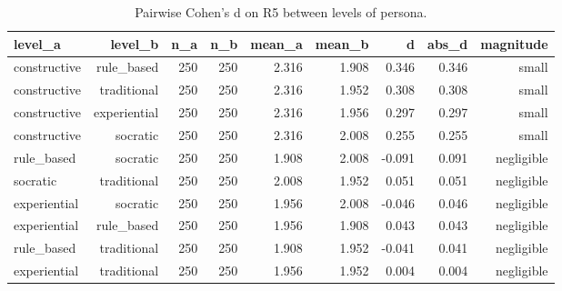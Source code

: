\begin{table}[htbp]
\centering
\caption{Pairwise Cohen's d on R5 between levels of persona.}
\label{tab:cohensd-persona-R5}
\begin{tabular}{lrrrrrrrr}
\toprule
level\_a & level\_b & n\_a & n\_b & mean\_a & mean\_b & d & abs\_d & magnitude \\
\midrule
constructive & rule\_based & 250 & 250 & 2.316 & 1.908 & 0.346 & 0.346 & small \\
constructive & traditional & 250 & 250 & 2.316 & 1.952 & 0.308 & 0.308 & small \\
constructive & experiential & 250 & 250 & 2.316 & 1.956 & 0.297 & 0.297 & small \\
constructive & socratic & 250 & 250 & 2.316 & 2.008 & 0.255 & 0.255 & small \\
rule\_based & socratic & 250 & 250 & 1.908 & 2.008 & -0.091 & 0.091 & negligible \\
socratic & traditional & 250 & 250 & 2.008 & 1.952 & 0.051 & 0.051 & negligible \\
experiential & socratic & 250 & 250 & 1.956 & 2.008 & -0.046 & 0.046 & negligible \\
experiential & rule\_based & 250 & 250 & 1.956 & 1.908 & 0.043 & 0.043 & negligible \\
rule\_based & traditional & 250 & 250 & 1.908 & 1.952 & -0.041 & 0.041 & negligible \\
experiential & traditional & 250 & 250 & 1.956 & 1.952 & 0.004 & 0.004 & negligible \\
\bottomrule
\end{tabular}
\end{table}
